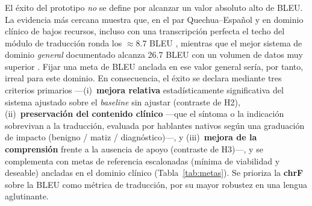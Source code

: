 \subsubsection{}
\begin{bloqueObsCuatro}
\noindent El {\'e}xito del prototipo \emph{no} se define por alcanzar un valor absoluto alto de BLEU.
La evidencia m{\'a}s cercana muestra que, en el par Quechua--Espa{\~n}ol y en dominio cl{\'i}nico de
bajos recursos, incluso con una transcripci{\'o}n perfecta el techo del m{\'o}dulo de traducci{\'o}n
ronda los $\approx$8.7 BLEU \parencite{QuispePalomino2026}, mientras que el mejor sistema de dominio
\emph{general} documentado alcanza 26.7 BLEU con un volumen de datos muy superior
\parencite{Ortega2025260}. Fijar una meta de BLEU anclada en ese valor general ser{\'i}a, por tanto,
irreal para este dominio. En consecuencia, el {\'e}xito se declara mediante tres criterios primarios
---(i)~\textbf{mejora relativa} estad{\'i}sticamente significativa del sistema ajustado sobre el
\emph{baseline} sin ajustar (contraste de H2), (ii)~\textbf{preservaci{\'o}n del contenido
cl{\'i}nico} ---que el s{\'i}ntoma o la indicaci{\'o}n sobrevivan a la traducci{\'o}n, evaluada por
hablantes nativos seg{\'u}n una graduaci{\'o}n de impacto (benigno / matiz / diagn{\'o}stico)---, y
(iii)~\textbf{mejora de la comprensi{\'o}n} frente a la ausencia de apoyo (contraste de H3)---, y se
complementa con metas de referencia escalonadas (m{\'i}nima de viabilidad y deseable) ancladas en el
dominio cl{\'i}nico (Tabla~\ref{tab:metas}). Se prioriza la \textbf{chrF} sobre la BLEU como
m{\'e}trica de traducci{\'o}n, por su mayor robustez en una lengua aglutinante.
\end{bloqueObsCuatro}

